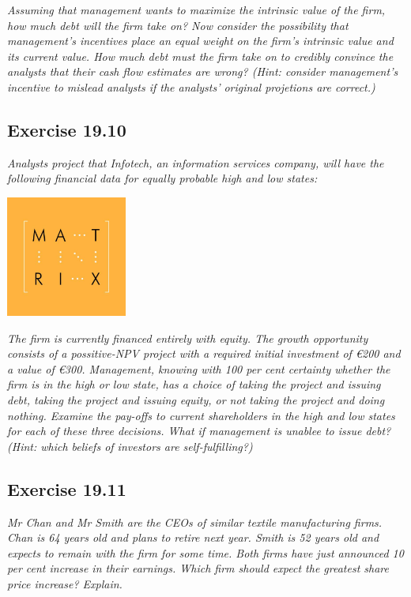 \documentclass[]{book}
\newcommand{\euro}{€}
\theoremstyle{definition}
\theoremstyle{definition}
\theoremstyle{remark}
\begin{document}
\emph{Assuming that management wants to maximize the intrinsic value of
the firm, how much debt will the firm take on? Now consider the
possibility that management's incentives place an equal weight on the
firm's intrinsic value and its current value. How much debt must the
firm take on to credibly convince the analysts that their cash flow
estimates are wrong? (Hint: consider management's incentive to mislead
analysts if the analysts' original projetions are correct.)}
\citep[p.642]{book}

\subsection{Exercise 19.10}\label{exercise-19.10}

\emph{Analysts project that Infotech, an information services company,
will have the following financial data for equally probable high and low
states:} \citep[p.642]{book}

\begin{center}\includegraphics[width=150px]{figures/matrix} \end{center}

\emph{The firm is currently financed entirely with equity. The growth
opportunity consists of a possitive-NPV project with a required initial
investment of \euro{}200 and a value of \euro{}300. Management, knowing
with 100 per cent certainty whether the firm is in the high or low
state, has a choice of taking the project and issuing debt, taking the
project and issuing equity, or not taking the project and doing nothing.
Examine the pay-offs to current shareholders in the high and low states
for each of these three decisions. What if management is unablee to
issue debt? (Hint: which beliefs of investors are self-fulfilling?)}
\citep[p.642]{book}

\subsection{Exercise 19.11}\label{exercise-19.11}

\emph{Mr Chan and Mr Smith are the CEOs of similar textile manufacturing
firms. Chan is 64 years old and plans to retire next year. Smith is 52
years old and expects to remain with the firm for some time. Both firms
have just announced 10 per cent increase in their earnings. Which firm
should expect the greatest share price increase? Explain.}
\citep[p.642]{book}
\end{document}
